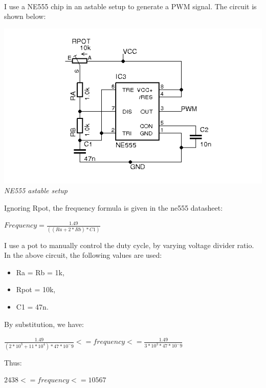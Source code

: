 \documentclass[12pt]{article}
\begin{document}
\paragraph{} I use a NE555 chip in an astable setup to generate a PWM signal. The circuit is
shown below:
\begin{center}
  \includegraphics[keepaspectratio=true, width=1.\textwidth]{../pics/ne555_astable.png}
  \\
  \smallskip
  \tiny{\textit{NE555 astable setup}}
\end{center}

Ignoring Rpot, the frequency formula is given in the ne555 datasheet:
\begin{center}
  $ Frequency = \frac{1.49}{((Ra + 2 * Rb) * C1)} $
\end{center}

I use a pot to manually control the duty cycle, by varying voltage divider ratio. In
the above circuit, the following values are used:
\begin{itemize}
\item Ra = Rb = 1k,
\item Rpot = 10k,
\item C1 = 47n.
\end{itemize}

By substitution, we have:
\begin{center}
  $ \frac{1.49}{(2 * 10^3 + 11 * 10^4) * 47 * 10^-9} <= frequency <= \frac{1.49}{3 * 10^3 * 47 * 10^-9} $\\
\end{center}

Thus:
\begin{center}
  $ 2438 <= frequency <= 10567 $
\end{center}
\end{document}
